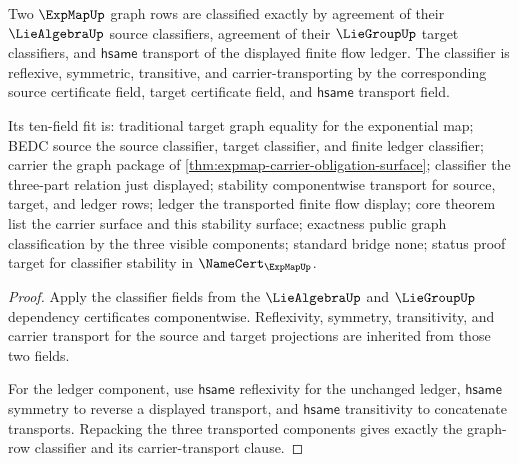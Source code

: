 \begin{theorem}
\label{thm:expmap-classifier-stability-obligation-surface}
Two $\ExpMapUp$ graph rows are classified exactly by agreement of their $\LieAlgebraUp$ source classifiers, agreement of their $\LieGroupUp$ target classifiers, and $\mathsf{hsame}$ transport of the displayed finite flow ledger. The classifier is reflexive, symmetric, transitive, and carrier-transporting by the corresponding source certificate field, target certificate field, and $\mathsf{hsame}$ transport field.

Its ten-field fit is: traditional target graph equality for the exponential map; BEDC source the source classifier, target classifier, and finite ledger classifier; carrier the graph package of \autoref{thm:expmap-carrier-obligation-surface}; classifier the three-part relation just displayed; stability componentwise transport for source, target, and ledger rows; ledger the transported finite flow display; core theorem list the carrier surface and this stability surface; exactness public graph classification by the three visible components; standard bridge none; status proof target for classifier stability in $\NameCert_{\ExpMapUp}$.
\end{theorem}
\begin{proof}
Apply the classifier fields from the $\LieAlgebraUp$ and $\LieGroupUp$ dependency certificates componentwise. Reflexivity, symmetry, transitivity, and carrier transport for the source and target projections are inherited from those two fields.

For the ledger component, use $\mathsf{hsame}$ reflexivity for the unchanged ledger, $\mathsf{hsame}$ symmetry to reverse a displayed transport, and $\mathsf{hsame}$ transitivity to concatenate transports. Repacking the three transported components gives exactly the graph-row classifier and its carrier-transport clause.
\end{proof}

